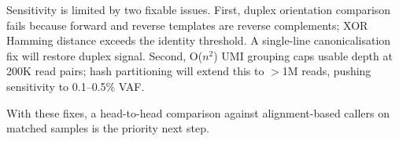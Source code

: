 \documentclass[10pt, twocolumn]{article}
\begin{document}
Sensitivity is limited by two fixable issues. First, duplex orientation
comparison fails because forward and reverse templates are reverse complements;
XOR Hamming distance exceeds the identity threshold. A single-line canonicalisation
fix will restore duplex signal. Second, O($n^2$) UMI grouping caps usable
depth at 200K read pairs; hash partitioning will extend this to $>$1M reads,
pushing sensitivity to 0.1--0.5\% VAF.

With these fixes, a head-to-head comparison against alignment-based callers on
matched samples is the priority next step.

\printbibliography[heading=bibnumbered, title={References}]
\end{document}
